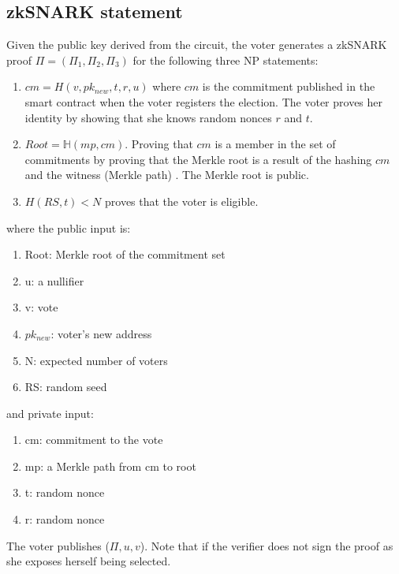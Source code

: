 \documentclass[]{article}
\begin{document}
\subsection{zkSNARK statement}
Given the public key derived from the circuit, the voter generates a zkSNARK proof $\Pi = (\Pi_1,\Pi_2,\Pi_3)$ for the following three NP statements:
\begin{enumerate}
	\item $cm = H(v,pk_{new},t,r,u)$ where $cm$ is the commitment published in the smart contract when the voter registers the election. The voter proves her identity by showing that she knows random nonces $r$ and $t$.
	\item $Root = \mathbb{H}(mp, cm)$. Proving that $cm$ is a member in the set of commitments by proving that the Merkle root is a result of the hashing $cm$ and the witness (Merkle path) . The Merkle root is public.
	\item $H(RS,t)<N$ proves that the voter is eligible.
\end{enumerate}
where the public input is:
\begin{enumerate}
	\item Root: Merkle root of the commitment set
	\item u: a nullifier
	\item v: vote  
	\item $pk_{new}$: voter's new address
	\item N: expected number of voters
	\item RS: random seed
\end{enumerate}	
and private input:
\begin{enumerate}
	\item cm: commitment to the vote
	\item mp: a Merkle path from cm to root
	\item t: random nonce
	\item r: random nonce
\end{enumerate}	
The voter publishes ($\Pi,u,v$). Note that if the verifier does not sign the proof as she exposes herself being selected.
\end{document}
